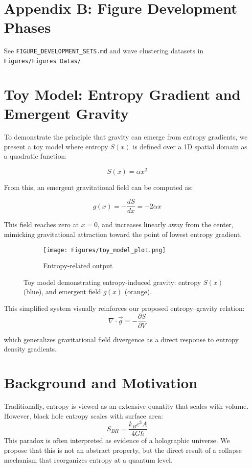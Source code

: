 \documentclass[12pt]{article}
\begin{document}
\section{Appendix B: Figure Development Phases}

See \texttt{FIGURE\_DEVELOPMENT\_SETS.md} and wave clustering datasets in \texttt{Figures/Figures~Datas/}.

\tableofcontents

\section{Toy Model: Entropy Gradient and Emergent Gravity}

To demonstrate the principle that gravity can emerge from entropy gradients, we present a toy model where entropy \( S(x) \) is defined over a 1D spatial domain as a quadratic function:

\[
S(x) = \alpha x^2
\]

From this, an emergent gravitational field can be computed as:

\[
g(x) = -\frac{dS}{dx} = -2\alpha x
\]

This field reaches zero at \( x = 0 \), and increases linearly away from the center, mimicking gravitational attraction toward the point of lowest entropy gradient.

\begin{figure}[H]
    \centering
    \begin{figure}[H]
\centering
\texttt{[image: Figures/toy\_model\_plot.png]}
\caption{Entropy-related output}
\label{fig:Figures_toy_model_plot_png}
\end{figure}

    \caption{Toy model demonstrating entropy-induced gravity: entropy \ensuremath{S(x)} (blue), and emergent field \ensuremath{g(x)} (orange).}
    \label{fig:toy_model}
\end{figure}




This simplified system visually reinforces our proposed entropy–gravity relation:
\[
\nabla \cdot \vec{g} = -\frac{\partial S}{\partial V}
\]

which generalizes gravitational field divergence as a direct response to entropy density gradients.
\section{Background and Motivation}
Traditionally, entropy is viewed as an extensive quantity that scales with volume. However, black hole entropy scales with surface area:
\begin{equation}
S_{BH} = \frac{k_B c^3 A}{4 G \hbar}
\end{equation}
This paradox is often interpreted as evidence of a holographic universe. We propose that this is not an abstract property, but the direct result of a collapse mechanism that reorganizes entropy at a quantum level.
\end{document}

